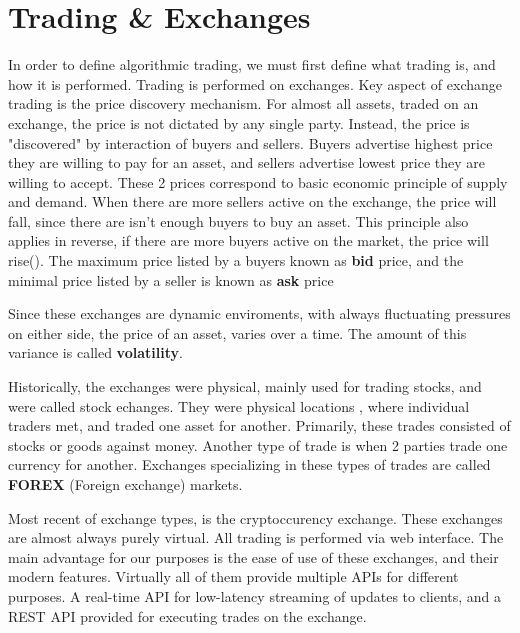 \section{Trading \& Exchanges}
In order to define algorithmic trading, we must first define what trading is, and how it is performed.
Trading is performed on exchanges. Key aspect of exchange trading is the price discovery mechanism. For almost all assets,
traded on an exchange, the price is not dictated by any single party. Instead, the price is "discovered" by interaction of
buyers and sellers. Buyers advertise highest price they are willing to pay for an asset, and sellers advertise lowest price
they are willing to accept. These 2 prices correspond to basic economic principle of supply and demand. When there are more sellers active
on the exchange, the price will fall, since there are  isn't enough buyers to buy an asset. This principle also applies in reverse, if there are more
buyers active on the market, the price will rise().
The maximum price listed by a buyers known as \textbf{bid} price, and the minimal price listed by a seller is known as \textbf{ask} price

Since these exchanges are dynamic enviroments, with always fluctuating pressures on either side, the price of an asset, varies over a time.
The amount of this variance is called \textbf{volatility}.

Historically, the exchanges were physical, mainly used for trading stocks, and
were called stock echanges. They were physical locations , where individual traders  met, and traded one asset for another.
Primarily, these trades consisted of stocks or goods against money. Another type of trade is when 2 parties trade one currency for another.
Exchanges specializing in these types of trades are called \textbf{FOREX} (Foreign exchange) markets.

Most recent of exchange types, is the cryptoccurency exchange. These exchanges are almost always purely virtual. All trading is performed
via web interface. The main advantage for our purposes is the ease of use of these exchanges, and their modern features.
Virtually all of them provide multiple APIs for different purposes. A real-time API for low-latency streaming of updates to clients,
and a REST API provided for executing trades on the exchange.
